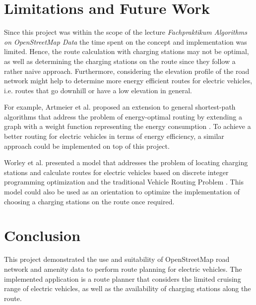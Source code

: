 \documentclass[a4paper]{article}
\begin{document}
\section{Limitations and Future Work}
Since this project was within the scope of the lecture \textit{Fachpraktikum Algorithms on OpenStreetMap Data} the time spent on the concept and implementation was limited.
Hence, the route calculation with charging stations may not be optimal, as well as determining the charging stations on the route since they follow a rather naive approach.
Furthermore, considering the elevation profile of the road network might help to determine more energy efficient routes for electric vehicles, i.e. routes that go downhill or have a low elevation in general.\par\medskip
For example, Artmeier et al. \cite{Artmeier2010} proposed an extension to general shortest-path algorithms that address the problem of energy-optimal routing by extending a graph with a weight function representing the energy consumption \cite{Artmeier2010}.
To achieve a better routing for electric vehicles in terms of energy efficiency, a similar approach could be implemented on top of this project.\par\medskip
Worley et al. \cite{Worley2012} presented a model that addresses the problem of locating charging stations and calculate routes for electric vehicles based on discrete integer programming optimization and the traditional Vehicle Routing Problem \cite{Worley2012}.
This model could also be used as an orientation to optimize the implementation of choosing a charging stations on the route once required.
\section{Conclusion}
This project demonstrated the use and suitability of OpenStreetMap road network and amenity data to perform route planning for electric vehicles.
The implemented application is a route planner that considers the limited cruising range of electric vehicles, as well as the availability of charging stations along the route.


\end{document}
